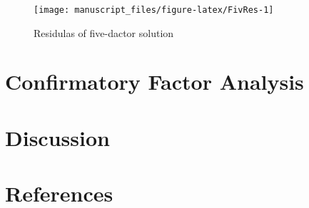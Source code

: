 \documentclass[
  english,
  man]{apa6}
\begin{document}
\begin{figure}

{\centering \texttt{[image: manuscript\_files/figure-latex/FivRes-1]} 

}

\caption{ Residulas of five-dactor solution}\label{fig:FivRes}
\end{figure}

\hypertarget{confirmatory-factor-analysis}{%
\section{Confirmatory Factor Analysis}\label{confirmatory-factor-analysis}}

\hypertarget{discussion}{%
\section{Discussion}\label{discussion}}

\newpage

\hypertarget{references}{%
\section{References}\label{references}}

\begingroup
\setlength{\parindent}{-0.5in}
\setlength{\leftskip}{0.5in}
\end{document}
